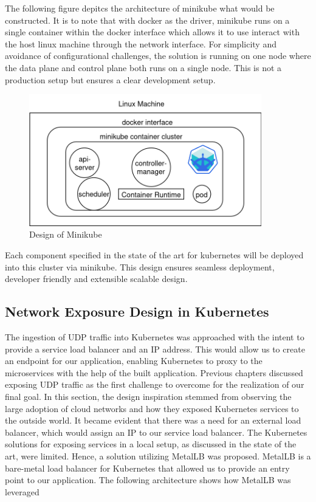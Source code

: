 {The following figure depitcs the architecture of minikube what would be constructed. It is to note that with docker as the driver, minikube runs on a single container within the docker interface which allows it to use interact with the host linux machine through the network interface. For simplicity and avoidance of configurational challenges, the solution is running on one node where the data plane and control plane both runs on a single node. This is not a production setup but ensures a clear development setup.

\begin{figure}[H]
\caption{Design of Minikube}
\centering
\includegraphics[width=0.9\textwidth]{Design/minikube_driver.png}
\end{figure}

Each component specified in the state of the art for kubernetes will be deployed into this cluster via minikube. This design ensures seamless deployment, developer friendly and extensible scalable design.


\subsection{Network Exposure Design in Kubernetes}
The ingestion of UDP traffic into Kubernetes was approached with the intent to provide a service load balancer and an IP address. This would allow us to create an endpoint for our application, enabling Kubernetes to proxy to the microservices with the help of the built application. Previous chapters discussed exposing UDP traffic as the first challenge to overcome for the realization of our final goal. In this section, the design inspiration stemmed from observing the large adoption of cloud networks and how they exposed Kubernetes services to the outside world. It became evident that there was a need for an external load balancer, which would assign an IP to our service load balancer. The Kubernetes solutions for exposing services in a local setup, as discussed in the state of the art, were limited. Hence, a solution utilizing MetalLB was proposed. MetalLB is a bare-metal load balancer for Kubernetes that allowed us to provide an entry point to our application. The following architecture shows how MetalLB was leveraged



}

